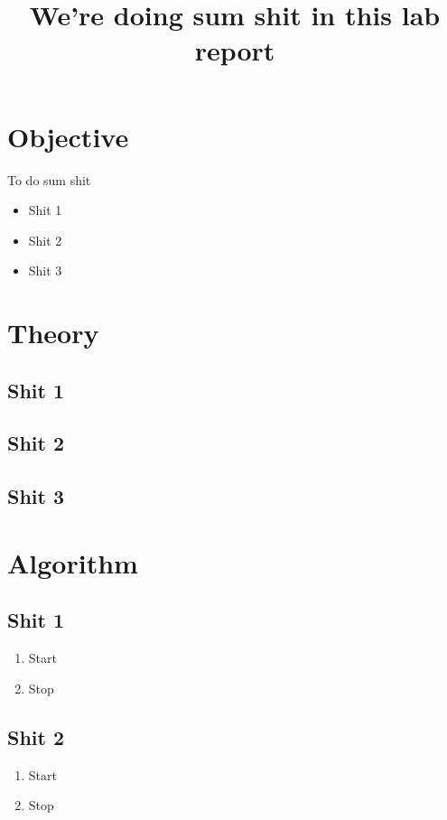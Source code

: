 \documentclass[12pt]{article}
\title{We're doing sum shit in this lab report}
\date{}
\author{}
\begin{document}
	\maketitle
	\vspace{-2cm}

	\section{Objective}
	To do sum shit
	\begin{itemize}
		\item Shit 1
		\item Shit 2
		\item Shit 3
	\end{itemize}
	
	\section{Theory}
	\subsection{Shit 1}


	\subsection{Shit 2}


	\subsection{Shit 3}


	\section{Algorithm}
	\subsection{Shit 1}
	\begin{enumerate}
		\item Start
		\item Stop
	\end{enumerate}

	\subsection{Shit 2}
	\begin{enumerate}
		\item Start
		\item Stop
	\end{enumerate}
\end{document}

